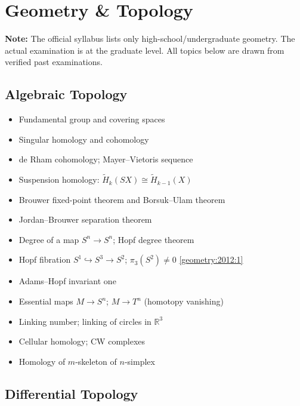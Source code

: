 \section{Geometry \& Topology}
\label{sec:prep-geometry}

\textbf{Note:} The official syllabus lists only high-school/undergraduate geometry. The actual examination is at the graduate level. All topics below are drawn from verified past examinations.

\subsection{Algebraic Topology}

\begin{itemize}
  \item Fundamental group and covering spaces
  \item Singular homology and cohomology
  \item de Rham cohomology; Mayer--Vietoris sequence
  \item Suspension homology: $\widetilde{H}_k(SX)\cong\widetilde{H}_{k-1}(X)$
  \item Brouwer fixed-point theorem and Borsuk--Ulam theorem
  \item Jordan--Brouwer separation theorem
  \item Degree of a map $S^n\to S^n$; Hopf degree theorem
  \item Hopf fibration $S^1\hookrightarrow S^3\to S^2$; $\pi_3(S^2)\neq0$ \hfill \cref{geometry:2012:1}
  \item Adams--Hopf invariant one
  \item Essential maps $M\to S^n$; $M\to T^n$ (homotopy vanishing)
  \item Linking number; linking of circles in $\mathbb{R}^3$
  \item Cellular homology; CW complexes
  \item Homology of $m$-skeleton of $n$-simplex
\end{itemize}

\subsection{Differential Topology}

